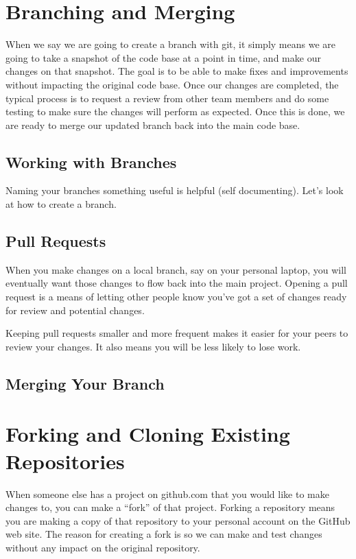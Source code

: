 \section{Branching and Merging}

When we say we are going to create a branch with git, it simply means we are going to take a snapshot of the code base at a point in time, and make our changes on that snapshot. The goal is to be able to make fixes and improvements without impacting the original code base.
Once our changes are completed, the typical process is to request a review from other team members and do some testing to make sure the changes will perform as expected. Once this is done, we are ready to merge our updated branch back into the main code base.

\subsection{Working with Branches}

\justify{}
Naming your branches something useful is helpful (self documenting). Let's look at how to create a branch.

\subsection{Pull Requests}

\justify{}
When you make changes on a local branch, say on your personal laptop, you will eventually want those changes
to flow back into the main project. Opening a pull request is a means of letting other
people know you've got a set of changes ready for review and potential changes.

\justify{}
Keeping pull requests smaller and more frequent makes it easier for your
peers to review your changes. It also means you will be less likely to lose work.

\subsection{Merging Your Branch}


\section{Forking and Cloning Existing Repositories}

\justify{}
When someone else has a project on github.com that you would like to make changes to, you can make a ``fork'' of that project.
Forking a repository means you are making a copy of that repository to your personal account on the GitHub web
site. The reason for creating a fork is so we can make and test changes without any impact on the original repository.


